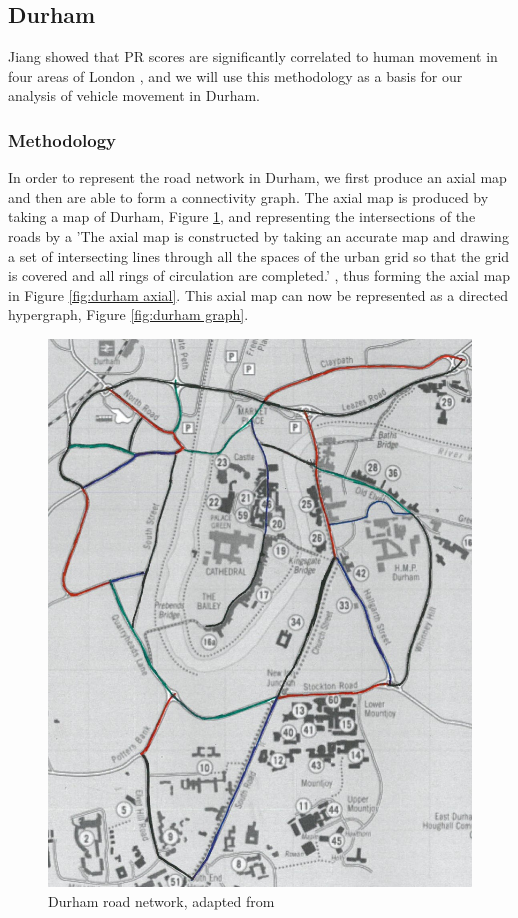 \subsection{Durham} \label{sec:durham}
Jiang showed that PR scores are significantly correlated to human movement in four areas of London \cite{doi:10.1080/13658810802022822}, and we will use this methodology as a basis for our analysis of vehicle movement in Durham. 
\subsubsection{Methodology}
In order to represent the road network in Durham, we first produce an axial map and then are able to form a connectivity graph. The axial map is produced by taking a map of Durham, Figure \ref{fig:durham map}, and representing the intersections of the roads by a 'The axial map is constructed by taking an accurate map and drawing a set of intersecting lines through all the spaces of the urban grid so that the grid is covered and all rings of circulation are completed.' \cite{Axialmap40:online}, thus forming the axial map in Figure \ref{fig:durham axial}. This axial map can now be represented as a directed hypergraph, Figure \ref{fig:durham graph}. 

\begin{figure}[h]
\centering
\includegraphics[width=\linewidth]{durham_with_colour.jpg}
\caption{Durham road network, adapted from \cite{undergraduate}}
\label{fig:durham map}
\end{figure}

